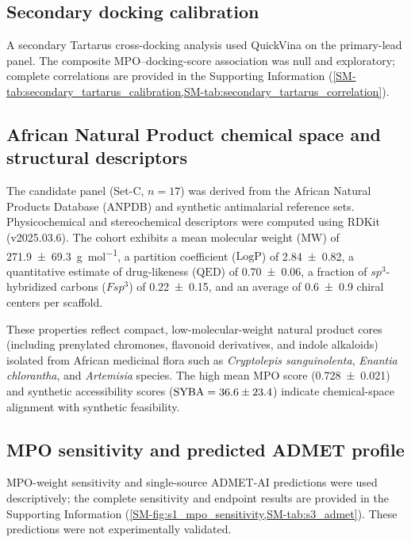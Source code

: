 \documentclass[journal=jcisd8,manuscript=article,layout=traditional]{achemso}
\begin{document}
\subsection{Secondary docking calibration}

A secondary Tartarus cross-docking analysis used QuickVina on the primary-lead panel. The composite MPO--docking-score association was null and exploratory; complete correlations are provided in the Supporting Information (\cref{SM-tab:secondary_tartarus_calibration,SM-tab:secondary_tartarus_correlation}).

\subsection{African Natural Product chemical space and structural descriptors}

The candidate panel (Set-C, $n=\num{17}$) was derived from the African Natural Products Database (ANPDB) and synthetic antimalarial reference sets. Physicochemical and stereochemical descriptors were computed using RDKit (v2025.03.6). The cohort exhibits a mean molecular weight ($\mathrm{MW}$) of \qty{271.9 \pm 69.3}{\g\per\mole}, a partition coefficient ($\mathrm{LogP}$) of \num{2.84 \pm 0.82}, a quantitative estimate of drug-likeness ($\mathrm{QED}$) of \num{0.70 \pm 0.06}, a fraction of $sp^3$-hybridized carbons ($Fsp^3$) of \num{0.22 \pm 0.15}, and an average of \num{0.6 \pm 0.9} chiral centers per scaffold.

These properties reflect compact, low-molecular-weight natural product cores (including prenylated chromones, flavonoid derivatives, and indole alkaloids) isolated from African medicinal flora such as \textit{Cryptolepis sanguinolenta}, \textit{Enantia chlorantha}, and \textit{Artemisia} species. The high mean MPO score (\num{0.728 \pm 0.021}) and synthetic accessibility scores ($\mathrm{SYBA} = \num{36.6 \pm 23.4}$) indicate chemical-space alignment with synthetic feasibility.

\subsection{MPO sensitivity and predicted ADMET profile}

MPO-weight sensitivity and single-source ADMET-AI predictions were used descriptively; the complete sensitivity and endpoint results are provided in the Supporting Information (\cref{SM-fig:s1_mpo_sensitivity,SM-tab:s3_admet}). These predictions were not experimentally validated.
\end{document}
